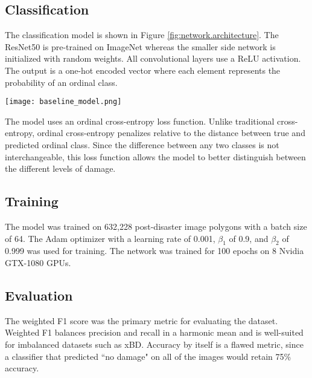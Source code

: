 \documentclass[10pt,twocolumn,letterpaper]{article}
\begin{document}
\subsection{Classification}
The classification model is shown in Figure \ref{fig:network.architecture}. The ResNet50 is pre-trained on ImageNet \cite{dengImageNetLargeScaleHierarchical} whereas the smaller side network is initialized with random weights.
All convolutional layers use a ReLU activation.
The output is a one-hot encoded vector where each element represents the probability of an ordinal class.

\begin{figure*}[!h]
	\begin{center}
		\texttt{[image: baseline\_model.png]}
	\end{center}
	\caption{Architecture of the baseline classification model. The input is fed into a pre-trained ResNet 50 as well as a shallow CNN. The outputs of each stream are concatenated and passed into dense layers for classification.}
	\label{fig:network.architecture}
\end{figure*}

The model uses an ordinal cross-entropy loss function.
Unlike traditional cross-entropy, ordinal cross-entropy penalizes relative to the distance between true and predicted ordinal class.
Since the difference between any two classes is not interchangeable, this loss function allows the model to better distinguish between the different levels of damage.

\subsection{Training}
The model was trained on 632,228 post-disaster image polygons with a batch size of 64.
The Adam optimizer with a learning rate of 0.001, $\beta_1$ of 0.9, and $\beta_2$ of 0.999 was used for training.
The network was trained for 100 epochs on 8 Nvidia GTX-1080 GPUs.

\subsection{Evaluation}
The weighted F1 score was the primary metric for evaluating the dataset.
Weighted F1 balances precision and recall in a harmonic mean and is well-suited for imbalanced datasets such as xBD.
Accuracy by itself is a flawed metric, since a classifier that predicted ``no damage" on all of the images would retain 75\% accuracy.
\end{document}
